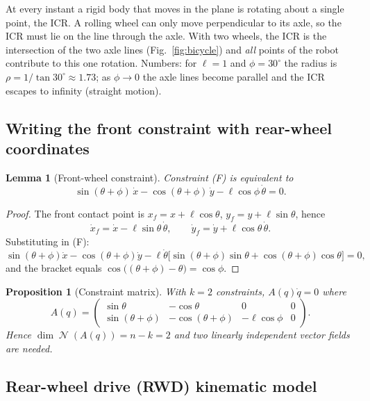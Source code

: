 \documentclass[11pt,a4paper]{article}
\DeclareMathOperator{\Ker}{\mathcal{N}}
\theoremstyle{definition}
\theoremstyle{plain}
\newtheorem{lemma}[definition]{Lemma}
\newtheorem{proposition}[definition]{Proposition}
\theoremstyle{remark}
\begin{document}
\begin{intuition}
At every instant a rigid body that moves in the plane is rotating about a single point, the ICR. A rolling wheel can only move perpendicular to its axle, so the ICR must lie on the line through the axle. With two wheels, the ICR is the intersection of the two axle lines (Fig.~\ref{fig:bicycle}) and \emph{all} points of the robot contribute to this one rotation. Numbers: for $\ell=1$ and $\phi=30^\circ$ the radius is $\rho=1/\tan30^\circ\approx1.73$; as $\phi\to0$ the axle lines become parallel and the ICR escapes to infinity (straight motion).
\end{intuition}

\subsection{Writing the front constraint with rear-wheel coordinates}

\begin{lemma}[Front-wheel constraint]
\label{lem:front}
Constraint (F) is equivalent to
\[
\sin(\theta+\phi)\,\dot x-\cos(\theta+\phi)\,\dot y-\ell\cos\phi\,\dot\theta=0 .
\]
\end{lemma}
\begin{proof}
The front contact point is $x_f=x+\ell\cos\theta$, $y_f=y+\ell\sin\theta$, hence
\[
\dot x_f=\dot x-\ell\sin\theta\,\dot\theta,\qquad \dot y_f=\dot y+\ell\cos\theta\,\dot\theta .
\]
Substituting in (F):
\[
\sin(\theta+\phi)\dot x-\cos(\theta+\phi)\dot y-\ell\dot\theta\big[\sin(\theta+\phi)\sin\theta+\cos(\theta+\phi)\cos\theta\big]=0,
\]
and the bracket equals $\cos\big((\theta+\phi)-\theta\big)=\cos\phi$.
\end{proof}

\begin{proposition}[Constraint matrix]
With $k=2$ constraints, $A(q)\dot q=0$ where
\[
A(q)=\begin{pmatrix}
\sin\theta & -\cos\theta & 0 & 0\\
\sin(\theta+\phi) & -\cos(\theta+\phi) & -\ell\cos\phi & 0
\end{pmatrix}.
\]
Hence $\dim\Ker(A(q))=n-k=2$ and two linearly independent vector fields are needed.
\end{proposition}

\subsection{Rear-wheel drive (RWD) kinematic model}
\end{document}
